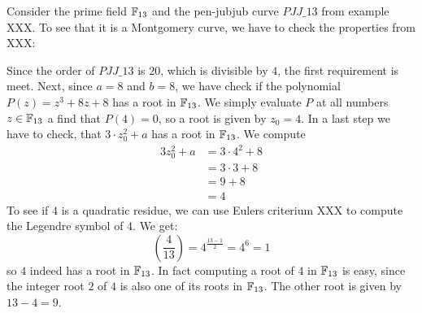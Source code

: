 \begin{example}Consider the prime field $\mathbb{F}_{13}$ and the pen-jubjub curve $\mathit{PJJ\_13}$ from example XXX. To see that it is a Montgomery curve, we have to check the properties from XXX:

Since the order  of $\mathit{PJJ\_13}$ is $20$, which is divisible by $4$, the first requirement is meet. Next, since $a=8$ and $b=8$, we have check if the polynomial $P(z) = z^3 + 8z + 8$ has a root in $\mathbb{F}_{13}$. We simply evaluate $P$ at all numbers $z\in \mathbb{F}_{13}$ a find that $P(4)=0$, so a root is given by $z_0=4$. In a last step we have to check, that $3\cdot z_0^2 + a$ has a root in $\mathbb{F}_{13}$. We compute
\begin{align*}
3z_0^2 + a & = 3\cdot 4^2 + 8 \\
           & = 3 \cdot 3 + 8 \\
           & = 9 + 8 \\
           & = 4
\end{align*}
To see if $4$ is a quadratic residue, we can use Eulers criterium XXX to compute the Legendre symbol of $4$. We get:
$$
\left(\frac{4}{13}\right) = 4^{\frac{13-1}{2}} = 4^6 = 1
$$
so $4$ indeed has a root in $\mathbb{F}_{13}$. In fact computing a root of $4$ in $\mathbb{F}_{13}$ is easy, since the integer root $2$ of $4$ is also one of its roots in $\mathbb{F}_{13}$. The other root is given by $13-4=9$.


\end{example}

